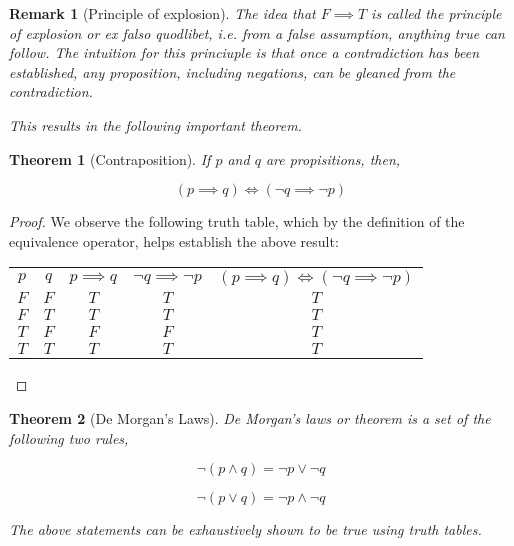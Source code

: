 \documentclass[12pt]{article}
\newtheorem{theorem}{Theorem}[section]
\newtheorem{remark}{Remark}[section]
\begin{document}
\begin{shaded}
\begin{remark}[Principle of explosion]
The idea that $F \implies T$ is called the \emph{principle of explosion} or \emph{ex falso quodlibet}, i.e. from a false assumption, anything true can follow. The intuition for this princiuple is that once a contradiction has been established, any proposition, including negations, can be gleaned from the contradiction.

This results in the following important theorem.
\end{remark}

\begin{theorem}[Contraposition] If $p$ and $q$ are propisitions, then,

$$\left( p \implies q \right) \Longleftrightarrow \left( \lnot q \implies \lnot p \right)$$
\end{theorem}

\begin{proof}
We observe the following truth table, which by the definition of the equivalence operator, helps establish the above result:

\begin{center}
\begin{tabular}{|c|c||c|c||c|}
\hline
$p$ & $q$ & $p \implies q$ & $\lnot q \implies \lnot p$ & $\left( p \implies q \right) \Longleftrightarrow \left( \lnot q \implies \lnot p \right)$ \\
\hhline{|=|=||=|=||=|}
$F$ & $F$ & $T$ & $T$ & $T$ \\
\hline
$F$ & $T$ & $T$ & $T$ & $T$ \\
\hline
$T$ & $F$ & $F$ & $F$ & $T$ \\
\hline
$T$ & $T$ & $T$ & $T$ & $T$ \\
\hline
\end{tabular}
\end{center}
\end{proof}
\end{shaded}

\begin{shaded}
\begin{theorem}[De Morgan's Laws]
De Morgan's laws or theorem is a set of the following two rules,

$$\lnot \left( p \land q \right) = \lnot p \lor \lnot q$$

$$\lnot \left( p \lor q \right) = \lnot p \land \lnot q$$

The above statements can be exhaustively shown to be true using truth tables.
\end{theorem}
\end{shaded}
\end{document}
